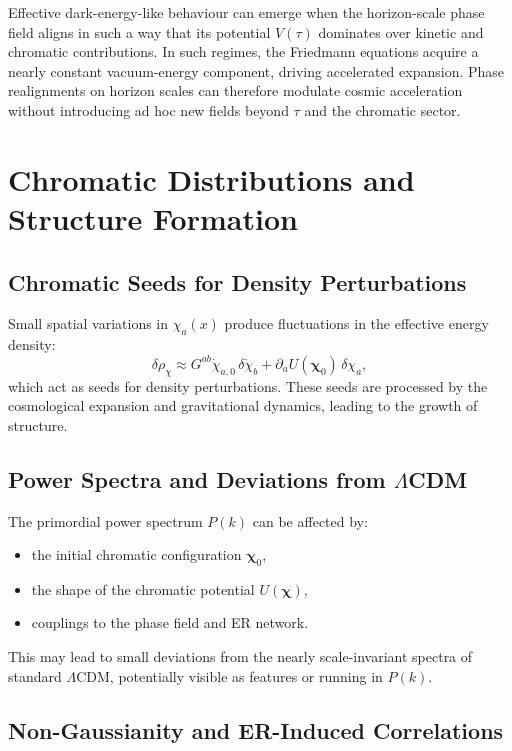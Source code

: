 Effective dark-energy-like behaviour can emerge when the horizon-scale phase field aligns in such a way that its potential $V(\tau)$ dominates over kinetic and chromatic contributions.
In such regimes, the Friedmann equations acquire a nearly constant vacuum-energy component, driving accelerated expansion.
Phase realignments on horizon scales can therefore modulate cosmic acceleration without introducing ad hoc new fields beyond $\tau$ and the chromatic sector.

\chapter{Chromatic Distributions and Structure Formation}

\section{Chromatic Seeds for Density Perturbations}

Small spatial variations in $\chi_a(x)$ produce fluctuations in the effective energy density:
\[
  \delta \rho_\chi \approx G^{ab}\dot{\chi}_{a,0}\,\delta\dot{\chi}_b + \partial_a U(\bm{\chi}_0)\,\delta\chi_a,
\]
which act as seeds for density perturbations.
These seeds are processed by the cosmological expansion and gravitational dynamics, leading to the growth of structure.

\section{Power Spectra and Deviations from \texorpdfstring{$\Lambda$}{Lambda}CDM}

The primordial power spectrum $P(k)$ can be affected by:
\begin{itemize}
  \item the initial chromatic configuration $\bm{\chi}_0$,
  \item the shape of the chromatic potential $U(\bm{\chi})$,
  \item couplings to the phase field and ER network.
\end{itemize}
This may lead to small deviations from the nearly scale-invariant spectra of standard $\Lambda$CDM, potentially visible as features or running in $P(k)$.

\section{Non-Gaussianity and ER-Induced Correlations}

